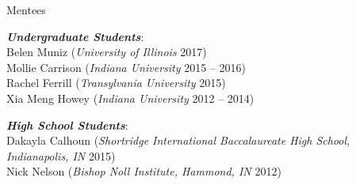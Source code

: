 \documentclass{resume} %
\begin{document}

\begin{rSection}{Mentees}

  {\bf \em Undergraduate Students}: \\
    Belen Muniz ({\em University of Illinois} 2017)\\
    Mollie Carrison ({\em Indiana University} 2015 -- 2016)\\
    Rachel Ferrill ({\em Transylvania University} 2015) \\
    Xia Meng Howey ({\em Indiana University} 2012 -- 2014)

  {\bf \em High School Students}: \\
    Dakayla Calhoun ({\em Shortridge International Baccalaureate High
    School, Indianapolis, IN} 2015)\\
    Nick Nelson ({\em Bishop Noll Institute, Hammond, IN} 2012)

\end{rSection}
\end{document}
